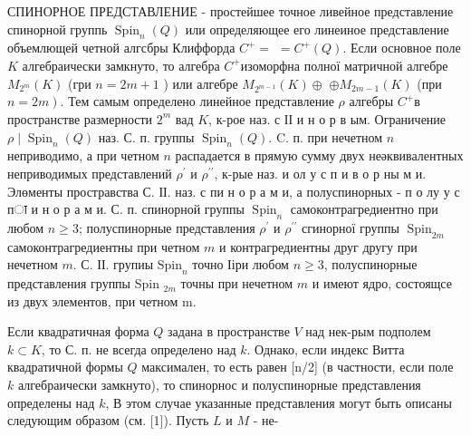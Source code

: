 \documentclass[10pt]{article}
\begin{document}
СПИНОРНОЕ ПРЕДСТАВЛЕНИЕ - простейшее точное ливейное представление спинорной группь $\operatorname{Spin}_{n}(Q)$ или определяющее его линеиное представление объемлющей четной алгсбры Клиффорда $C^{+}=$ $=C^{+}(Q)$. Если основное поле $K$ алгебраически замкнуто, то алгебра $C^{+}$изоморфна полної матричной алгебре $M_{2^{m}}(K)$ (гри $n=2 m+1$ ) или алгебре $M_{2^{m-1}}(K) \oplus$ $\oplus M_{2 m-1}(K)$ (при $\left.n=2 m\right)$. Тем самым определено линейное представление $\rho$ алгебры $C^{+}$в пространстве размерности $2^{m}$ вад $K$, к-рое наз. с ІІ и н о р в ым. Ограничение $\rho \mid \operatorname{Spin}_{n}(Q)$ наз. С. п. группы $\operatorname{Spin}_{n}(Q)$. C. п. при нечетном $n$ неприводимо, а при четном $n$ распадается в прямую сумму двух неәквивалентных неприводимых представлений $\rho^{\prime}$ и $\rho^{\prime \prime}$, к-рые наз. и ол у с п и в о р ны м и. Элөменты простравства С. ІІ. наз. с пи н о р а м и, а полуспинорных - п о лу у с пा и н о р а м и. С. п. спинорной группы $\operatorname{Spin}_{n}$ самоконтрагредиентно при любом $n \geqslant 3$; полуспинорные представления $\rho^{\prime}$ и $\rho^{\prime \prime}$ сгинорної группы $\operatorname{Spin}_{2 m}$ самоконтрагредиентны при четном $m$ и контрагредиентны друг другу при нечетном $m$. С. ІІ. групиы $\mathrm{Spin}_{n}$ точно Ііри любом $n \geqslant 3$, полуспинорные представления группы Spin $_{2 m}$ точны при нечетном $m$ и имеют ядро, состоящсе из двух элементов, при четном $\mathrm{m}$.



Если квадратичная форма $Q$ задана в пространстве $V$ над нек-рым подполем $k \subset K$, то С. п. не всегда определено над $k$. Однако, если индекс Витта квадратичной формы $Q$ максимален, то есть равен [n/2] (в частности, если поле $k$ алгебраически замкнуто), то спинорнос и полуспинорные представления определены над $k$, В этом случае указанные представления могут быть описаны следующим образом (см. [1]). Пусть $L$ и $M$ - не-
\end{document}
